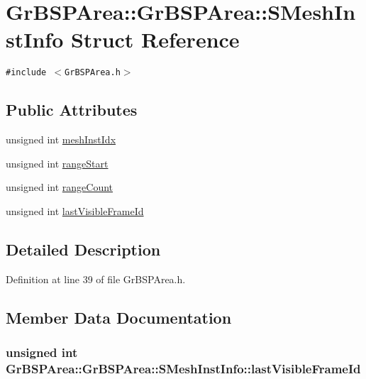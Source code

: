 \hypertarget{struct_gr_b_s_p_area_1_1_s_mesh_inst_info}{
\section{GrBSPArea::GrBSPArea::SMeshInstInfo Struct Reference}
\label{struct_gr_b_s_p_area_1_1_s_mesh_inst_info}
}
{\tt \#include $<$GrBSPArea.h$>$}

\subsection*{Public Attributes}
\begin{CompactItemize}
\item 
unsigned int \hyperlink{struct_gr_b_s_p_area_1_1_s_mesh_inst_info_cbc04c50efb0f6be8b67797894d4a432}{meshInstIdx}
\item 
unsigned int \hyperlink{struct_gr_b_s_p_area_1_1_s_mesh_inst_info_89f8bfcc8ffdf02fb93f230a1c73e1b9}{rangeStart}
\item 
unsigned int \hyperlink{struct_gr_b_s_p_area_1_1_s_mesh_inst_info_862a02786df63d5fb626d51ab88a769c}{rangeCount}
\item 
unsigned int \hyperlink{struct_gr_b_s_p_area_1_1_s_mesh_inst_info_4d10e7d119ce090e466f2685808e9ed8}{lastVisibleFrameId}
\end{CompactItemize}


\subsection{Detailed Description}


Definition at line 39 of file GrBSPArea.h.

\subsection{Member Data Documentation}
\hypertarget{struct_gr_b_s_p_area_1_1_s_mesh_inst_info_4d10e7d119ce090e466f2685808e9ed8}{
\subsubsection[{lastVisibleFrameId}]{\setlength{\rightskip}{0pt plus 5cm}unsigned int GrBSPArea::GrBSPArea::SMeshInstInfo::lastVisibleFrameId}}
\label{struct_gr_b_s_p_area_1_1_s_mesh_inst_info_4d10e7d119ce090e466f2685808e9ed8}




